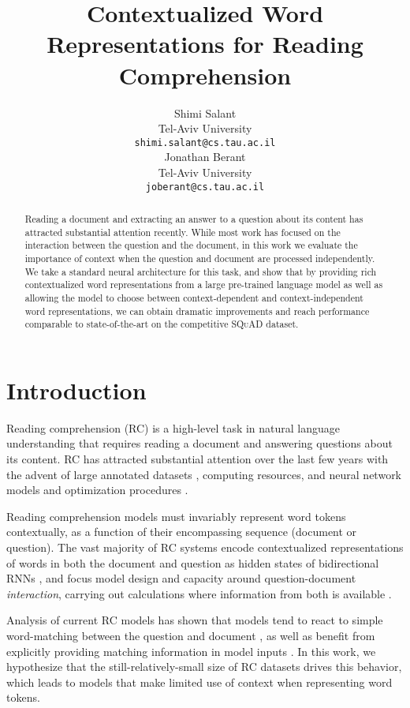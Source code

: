 \documentclass[11pt,a4paper]{article}
\title{Contextualized Word Representations for Reading Comprehension}
\author{Shimi Salant \\
  Tel-Aviv University \\
  {\tt {\small shimi.salant@cs.tau.ac.il}} \\\And
  Jonathan Berant \\
  Tel-Aviv University \\
  {\tt {\small joberant@cs.tau.ac.il}} \\}
\date{}
\begin{document}
\maketitle

\begin{abstract}
Reading a document and extracting an answer to a question about its content has attracted substantial attention recently. While most work has focused on the interaction between the question and the document, in this work we evaluate the importance of context when the question and document are processed independently. We take a standard neural architecture for this task, and show that by providing rich contextualized word representations from a large pre-trained language model as well as allowing the model to choose between context-dependent and context-independent word representations, we can obtain dramatic improvements and reach performance comparable to state-of-the-art on the competitive \textsc{SQuAD} dataset. 
\end{abstract} \section{Introduction}
\label{sec:introduction}

Reading comprehension (RC) is a high-level task in natural language understanding that requires  reading a document and answering questions about its content. RC has attracted substantial attention over the last few years with the advent of large annotated datasets \cite{DBLP:journals/corr/HermannKGEKSB15,rajpurkar2016,DBLP:journals/corr/TrischlerWYHSBS16,DBLP:conf/nips/NguyenRSGTMD16,DBLP:conf/acl/JoshiCWZ17}, computing resources, and neural network models and optimization procedures \citep{DBLP:journals/corr/WestonBCM15,DBLP:conf/nips/SukhbaatarSWF15,DBLP:journals/corr/KumarISBEPOGS15}.

Reading comprehension models must invariably represent word tokens contextually, as a function of their encompassing sequence (document or question).
The vast majority of RC systems encode contextualized representations of words in both the document and question as hidden states of bidirectional RNNs \cite{hochreiter1997lstm,DBLP:journals/tsp/SchusterP97,DBLP:conf/ssst/ChoMBB14}, and focus model design and capacity around question-document \textit{interaction},
carrying out calculations where information from both is available \citep{seo2017,xiong2017,fusionnet,DBLP:conf/acl/WangYWCZ17}.

Analysis of current RC models has shown that models tend to react to simple word-matching between the question and document \citep{DBLP:conf/emnlp/JiaL17}, as well as benefit from explicitly providing matching information in model inputs \citep{DBLP:journals/corr/HuPQ17,DBLP:conf/acl/ChenFWB17,DBLP:conf/conll/WeissenbornWS17}. In this work, we hypothesize that the still-relatively-small size of RC datasets drives this behavior, which leads to models that make limited use of context when representing word tokens.
\end{document}
